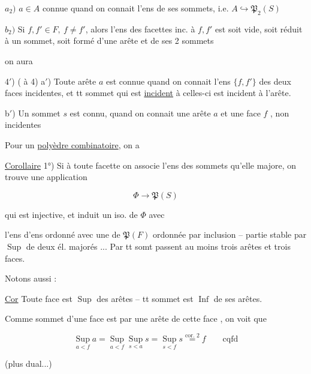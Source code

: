 $a_2)$ $a\in A$ connue quand on connait l'ens de ses sommets, i.e. $A\hookrightarrow\mathfrak P_2(S)$

$b_2)$ Si $f,f'\in F,\ f\ne f'$, alors l'ens des facettes inc. à $f,f'$ est soit vide, soit réduit à un sommet, soit formé d'une arête et de ses 2 sommets

on aura


4$'$) ( à 4) a$'$) Toute arête $a$ est connue quand on connait l'ens $\{f,f'\}$ des deux faces incidentes, et tt sommet qui est \uline{incident}  à celles-ci est incident à l'arête.

b$'$) Un sommet $s$ est connu, quand on connait une arête $a$ et une face $f$ , non incidentes

Pour un \uline{polyèdre combinatoire}, on a

\uline{Corollaire} 1°) Si à toute facette on associe l'ens des sommets qu'elle majore, on trouve une application

\[
 \Phi\longrightarrow\mathfrak P(S)
\]

qui est injective, et induit un iso.  de $\Phi$ avec



l'ens d'ens ordonné avec  une   de $\mathfrak P(F)$ ordonnée par inclusion -- partie stable par $\operatorname{Sup}$ de deux él. majorés ... Par tt somt passent au moins trois arêtes et trois faces.

Notons aussi :

\uline{Cor} Toute face est $\operatorname{Sup}$ des  arêtes -- tt sommet est $\operatorname{Inf}$ de ses arêtes.

Comme  sommet d'une face est  par une arête de cette face , on voit que

\[
 \operatorname*{Sup}_{a<f}a=\operatorname*{Sup}_{a<f}\operatorname*{Sup}_{s<a}s
 =\operatorname*{Sup}_{s<f}s\overset{\text{cor. 2}}{=}f\qquad\text{cqfd}
\]

(plus dual...)

